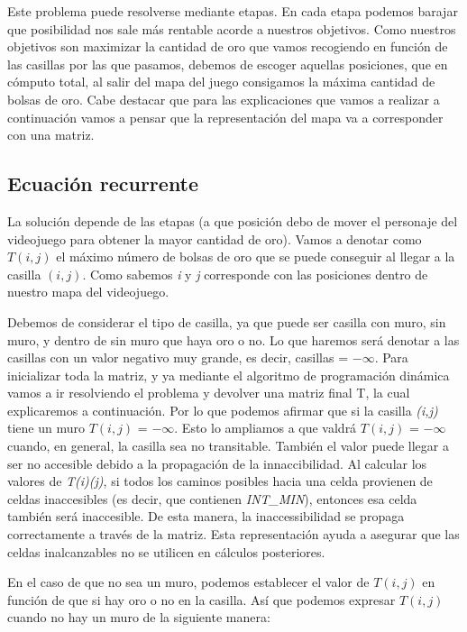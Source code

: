 Este problema puede resolverse mediante etapas. En cada etapa podemos barajar que posibilidad nos sale más rentable acorde a nuestros objetivos. Como nuestros objetivos son maximizar la cantidad de oro que vamos recogiendo en función de las casillas por las que pasamos, debemos de escoger aquellas posiciones, que en cómputo total, al salir del mapa del juego consigamos la máxima cantidad de bolsas de oro. Cabe destacar que para las explicaciones que vamos a realizar a continuación vamos a pensar que la representación del mapa va a corresponder con una matriz.

\subsection{Ecuación recurrente}

La solución depende de las etapas (a que posición debo de mover el personaje del videojuego para obtener la mayor cantidad de oro). Vamos a denotar como $T(i,j)$ el máximo número de bolsas de oro que se puede conseguir al llegar a la casilla $(i,j)$. Como sabemos \textit{i} y \textit{j} corresponde con las posiciones dentro de nuestro mapa del videojuego.

Debemos de considerar el tipo de casilla, ya que puede ser casilla con muro, sin muro, y dentro de sin muro que haya oro o no. Lo que haremos será denotar a las casillas con un valor negativo muy grande, es decir, casillas = \(-\infty\). Para inicializar toda la matriz, y ya mediante el algoritmo de programación dinámica vamos a ir resolviendo el problema y devolver una matriz final T, la cual explicaremos a continuación. 
Por lo que podemos afirmar que si la casilla \textit{(i,j)} tiene un muro $T(i,j)$ = \(-\infty\). Esto lo ampliamos a que valdrá $T(i,j)$ = \(-\infty\) cuando, en general, la casilla sea no transitable. También el valor puede llegar a ser no accesible debido a la propagación de la innaccibilidad. Al calcular los valores de \textit{T(i)(j)}, si todos los caminos posibles hacia una celda provienen de celdas inaccesibles (es decir, que contienen \textit{INT\_MIN}), entonces esa celda también será inaccesible. De esta manera, la inaccessibilidad se propaga correctamente a través de la matriz. Esta representación ayuda a asegurar que las celdas inalcanzables no se utilicen en cálculos posteriores.

En el caso de que no sea un muro, podemos establecer el valor de $T(i,j)$ en función de que si hay oro o no en la casilla. Así que podemos expresar $T(i,j)$ cuando no hay un muro de la siguiente manera:

